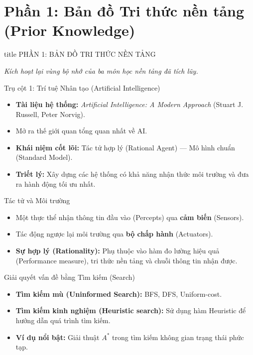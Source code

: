 \documentclass[aspectratio=169]{beamer}
\begin{document}
\section{Phần 1: Bản đồ Tri thức nền tảng (Prior Knowledge)}

\begin{frame}
    \vfill
    \centering
    \begin{beamercolorbox}[sep=8pt,center,shadow=true,rounded=true]{title}
        \Large PHẦN 1: BẢN ĐỒ TRI THỨC NỀN TẢNG
    \end{beamercolorbox}
    \vspace{0.5cm}
    \textit{Kích hoạt lại vùng bộ nhớ của ba môn học nền tảng đã tích lũy.}
    \vfill
\end{frame}

\begin{frame}{Trụ cột 1: Trí tuệ Nhân tạo (Artificial Intelligence)}
    \begin{itemize}
        \item \textbf{Tài liệu hệ thống:} \textit{Artificial Intelligence: A Modern Approach} (Stuart J. Russell, Peter Norvig).
        \item Mở ra thế giới quan tổng quan nhất về AI.
        \item \textbf{Khái niệm cốt lõi:} Tác tử hợp lý (Rational Agent) — Mô hình chuẩn (Standard Model).
        \item \textbf{Triết lý:} Xây dựng các hệ thống có khả năng nhận thức môi trường và đưa ra hành động tối ưu nhất.
    \end{itemize}
\end{frame}

\begin{frame}{Tác tử và Môi trường}
    \begin{itemize}
        \item Một thực thể nhận thông tin đầu vào (Percepts) qua \textbf{cảm biến} (Sensors).
        \item Tác động ngược lại môi trường qua \textbf{bộ chấp hành} (Actuators).
        \item \textbf{Sự hợp lý (Rationality):} Phụ thuộc vào hàm đo lường hiệu quả (Performance measure), tri thức nền tảng và chuỗi thông tin nhận được.
    \end{itemize}
\end{frame}

\begin{frame}{Giải quyết vấn đề bằng Tìm kiếm (Search)}
    \begin{itemize}
        \item \textbf{Tìm kiếm mù (Uninformed Search):} BFS, DFS, Uniform-cost.
        \item \textbf{Tìm kiếm kinh nghiệm (Heuristic search):} Sử dụng hàm Heuristic để hướng dẫn quá trình tìm kiếm.
        \item \textbf{Ví dụ nổi bật:} Giải thuật $A^*$ trong tìm kiếm không gian trạng thái phức tạp.
    \end{itemize}
\end{frame}
\end{document}

